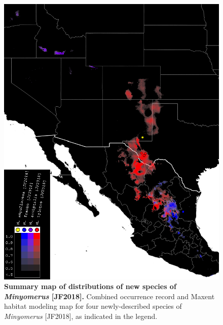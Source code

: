 \documentclass[fleqn,10pt,lineno]{wlpeerj} %
\begin{document}
\begin{figure}[h]
	\centering
	\includegraphics[width=\textwidth]{summary.png}
	\caption{\textbf{Summary map of distributions of new species of \textit{Minyomerus} [JF2018].} Combined occurrence record and Maxent habitat modeling map for four newly-described species of \textit{Minyomerus} [JF2018], as indicated in the legend.}
	\label{fig:map_summary}
\end{figure}
\end{document}
